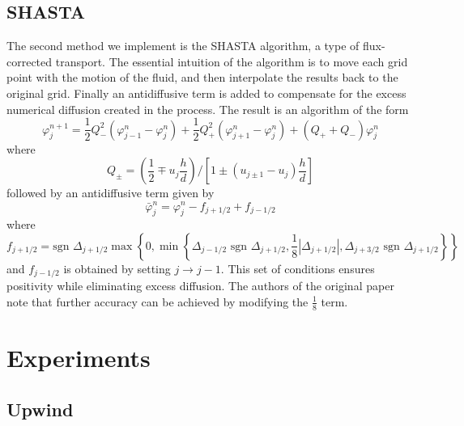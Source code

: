 \documentclass[12pt]{article}
\begin{document}
\subsection{SHASTA}

The second method we implement is the SHASTA algorithm, a type of flux-corrected transport. 
The essential intuition of the algorithm is to move each grid point with the motion of the fluid, and then interpolate the results back to the original grid. Finally an antidiffusive term is added to compensate for the excess numerical diffusion created in the process.
The result is an algorithm of the form 
\[\varphi_j^{n+1} = \frac{1}{2}Q_{-}^2 \left(\varphi^n_{j-1} - \varphi^n_{j}\right) + \frac{1}{2}Q_{+}^2 \left(\varphi_{j+1}^n - \varphi_{j}^n\right) + (Q_{+} + Q_{-})\varphi_j^n\]
where
\[Q_{\pm} = \left(\frac{1}{2} \mp u_j \frac{h}{d}\right)\big/\left[1 \pm (u_{j \pm 1} - u_j)\frac{h}{d}\right]\]
followed by an antidiffusive term given by
\[\bar \varphi_j^n = \varphi_j^n - f_{j + 1/2} + f_{j - 1/2}\]
where 
\[f_{j + 1/2} = \text{sgn } \Delta_{j+ 1/2} \max \left\{0, \min\left\{\Delta_{j-1/2}\text{ sgn }\Delta_{j+1/2}, \frac{1}{8}\left|\Delta_{j+1/2} \right|, \Delta_{j+3/2}\text{ sgn }\Delta_{j+1/2}\right\}\right\}\]
and $f_{j-1/2}$ is obtained by setting $j \rightarrow j-1$. This set of conditions ensures positivity while eliminating excess diffusion. The authors of the original paper note that further accuracy can be achieved by modifying the $\frac{1}{8}$ term.

\section{Experiments}

\subsection{Upwind}
\end{document}
